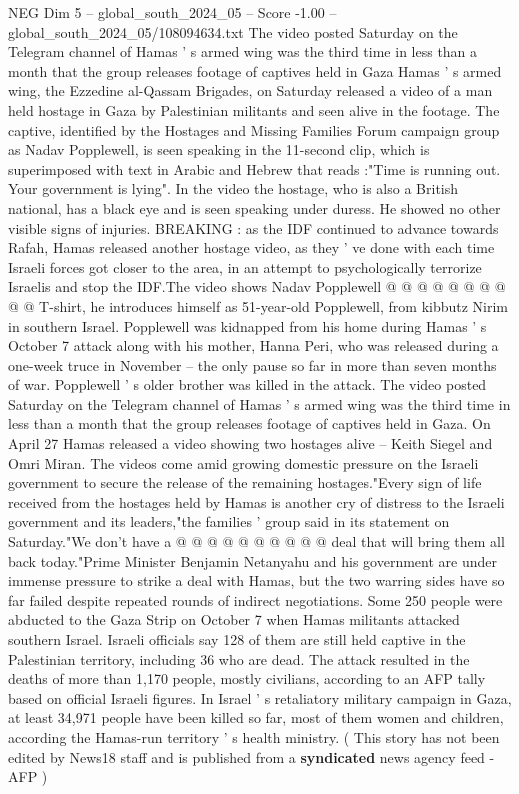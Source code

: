 \begin{textsample}{NEG Dim 5 – global\_south\_2024\_05 – Score -1.00 – global\_south\_2024\_05/108094634.txt}  \label{ex:f5_neg_323}
The video posted Saturday on the Telegram channel of Hamas ' s armed wing was the third time in less than a month that the group releases footage of captives held in Gaza Hamas ' s armed wing, the Ezzedine al-Qassam Brigades, on Saturday released a video of a man held hostage in Gaza by Palestinian militants and seen alive in the footage.
The captive, identified by the Hostages and Missing Families Forum campaign group as Nadav Popplewell, is seen speaking in the 11-second clip, which is superimposed with text in Arabic and Hebrew that reads :"Time is running out.
Your government is lying".
In the video the hostage, who is also a British national, has a black eye and is seen speaking under duress.
He showed no other visible signs of injuries.
BREAKING : as the IDF continued to advance towards Rafah, Hamas released another hostage video, as they ' ve done with each time Israeli forces got closer to the area, in an attempt to psychologically terrorize Israelis and stop the IDF.The video shows Nadav Popplewell @ @ @ @ @ @ @ @ @ @ T-shirt, he introduces himself as 51-year-old Popplewell, from kibbutz Nirim in southern Israel.
Popplewell was kidnapped from his home during Hamas ' s October 7 attack along with his mother, Hanna Peri, who was released during a one-week truce in November -- the only pause so far in more than seven months of war.
Popplewell ' s older brother was killed in the attack.
The video posted Saturday on the Telegram channel of Hamas ' s armed wing was the third time in less than a month that the group releases footage of captives held in Gaza.
On April 27 Hamas released a video showing two hostages alive -- Keith Siegel and Omri Miran.
The videos come amid growing domestic pressure on the Israeli government to secure the release of the remaining hostages."Every sign of life received from the hostages held by Hamas is another cry of distress to the Israeli government and its leaders,"the families ' group said in its statement on Saturday."We don't have a @ @ @ @ @ @ @ @ @ @ deal that will bring them all back today."Prime Minister Benjamin Netanyahu and his government are under immense pressure to strike a deal with Hamas, but the two warring sides have so far failed despite repeated rounds of indirect negotiations.
Some 250 people were abducted to the Gaza Strip on October 7 when Hamas militants attacked southern Israel.
Israeli officials say 128 of them are still held captive in the Palestinian territory, including 36 who are dead.
The attack resulted in the deaths of more than 1,170 people, mostly civilians, according to an AFP tally based on official Israeli figures.
In Israel ' s retaliatory military campaign in Gaza, at least 34,971 people have been killed so far, most of them women and children, according the Hamas-run territory ' s health ministry. ( This story has not been edited by News18 staff and is published from a \textbf{syndicated} news agency feed - AFP )

\end{textsample}
